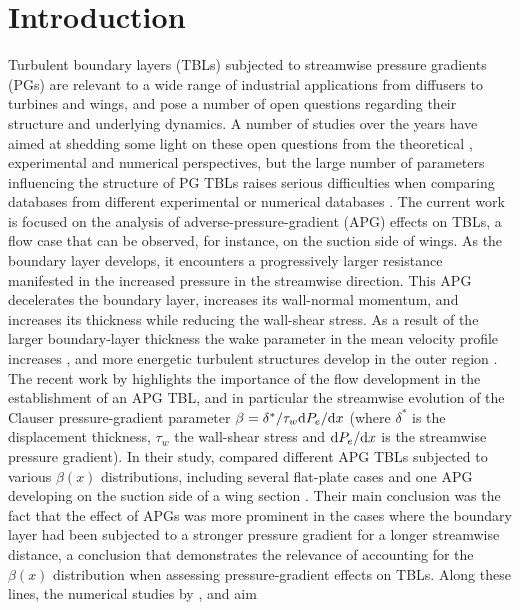 

%


\section{Introduction}

Turbulent boundary layers (TBLs) subjected to streamwise pressure gradients (PGs) are relevant to a wide range of industrial applications from diffusers to turbines and wings, and pose a number of open questions regarding their structure and underlying dynamics. A number of studies over the years have aimed at shedding some light on these open questions from the theoretical \citep{townsend,mellor_gibson}, experimental \citep{skare_krogstad,harun_et_al} and numerical \citep{spalart_watmuff,skote_et_al} perspectives, but the large number of parameters influencing the structure of PG TBLs raises serious difficulties when comparing databases from different experimental or numerical databases \citep{monty_et_al}. The current work is focused on the analysis of adverse-pressure-gradient (APG) effects on TBLs, a flow case that can be observed, for instance, on the suction side of wings. As the boundary layer develops, it encounters a progressively larger resistance manifested in the increased pressure in the streamwise direction. This APG decelerates the boundary layer, increases its wall-normal momentum, and increases its thickness while reducing the wall-shear stress. As a result of the larger boundary-layer thickness the wake parameter in the mean velocity profile increases \citep{vinuesa_aiaa}, and more energetic turbulent structures develop in the outer region \citep{maciel_et_al}. The recent work by \cite{bobke_et_al} highlights the importance of the flow development in the establishment of an APG TBL, and in particular the streamwise evolution of the Clauser pressure-gradient parameter $\beta= \delta^{*} / \tau_{w} {\rm d}P_{e} / {\rm d} x$ (where $\delta^{*}$ is the displacement thickness, $\tau_{w}$ the wall-shear stress and ${\rm d}P_{e} / {\rm d} x$ is the streamwise pressure gradient). In their study, \cite{bobke_et_al} compared different APG TBLs subjected to various $\beta(x)$ distributions, including several flat-plate cases and one APG developing on the suction side of a wing section \citep{hosseini_et_al}. Their main conclusion was the fact that the effect of APGs was more prominent in the cases where the boundary layer had been subjected to a stronger pressure gradient for a longer streamwise distance, a conclusion that demonstrates the relevance of accounting for the $\beta(x)$ distribution when assessing pressure-gradient effects on TBLs. Along these lines, the numerical studies by \cite{kitsios_et_al}, \cite{lee} and \cite{bobke_et_al} aim 